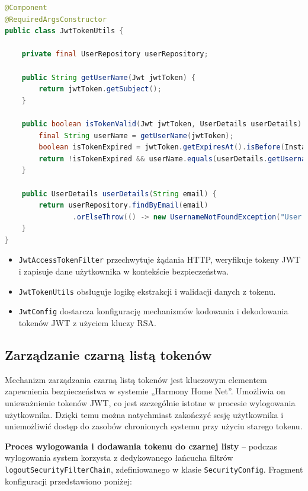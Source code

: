 \begin{lstlisting}[language=Java, caption=Klasa \texttt{JwtTokenUtils}]
@Component
@RequiredArgsConstructor
public class JwtTokenUtils {

    private final UserRepository userRepository;

    public String getUserName(Jwt jwtToken) {
        return jwtToken.getSubject();
    }

    public boolean isTokenValid(Jwt jwtToken, UserDetails userDetails) {
        final String userName = getUserName(jwtToken);
        boolean isTokenExpired = jwtToken.getExpiresAt().isBefore(Instant.now());
        return !isTokenExpired && userName.equals(userDetails.getUsername());
    }

    public UserDetails userDetails(String email) {
        return userRepository.findByEmail(email)
                .orElseThrow(() -> new UsernameNotFoundException("User not found"));
    }
}
\end{lstlisting}

\begin{itemize}
    \item \texttt{JwtAccessTokenFilter} przechwytuje żądania HTTP, weryfikuje tokeny JWT i zapisuje dane użytkownika w kontekście bezpieczeństwa.
    \item \texttt{JwtTokenUtils} obsługuje logikę ekstrakcji i walidacji danych z tokenu.
    \item \texttt{JwtConfig} dostarcza konfigurację mechanizmów kodowania i dekodowania tokenów JWT z użyciem kluczy RSA.
\end{itemize}


\subsection{Zarządzanie czarną listą tokenów}

Mechanizm zarządzania czarną listą tokenów jest kluczowym elementem zapewnienia bezpieczeństwa w systemie „Harmony Home Net”. Umożliwia on unieważnienie tokenów JWT, co jest szczególnie istotne w procesie wylogowania użytkownika. Dzięki temu można natychmiast zakończyć sesję użytkownika i uniemożliwić dostęp do zasobów chronionych systemu przy użyciu starego tokenu.

\textbf{Proces wylogowania i dodawania tokenu do czarnej listy} -- podczas wylogowania system korzysta z dedykowanego łańcucha filtrów \texttt{logoutSecurityFilterChain}, zdefiniowanego w klasie \texttt{SecurityConfig}. Fragment konfiguracji przedstawiono poniżej:

